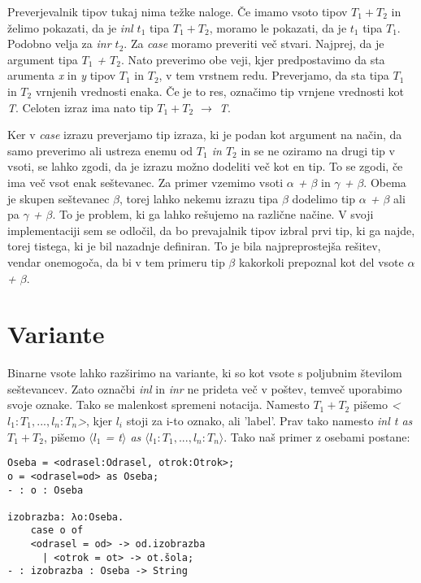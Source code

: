 \documentclass[12pt,a4paper,openany]{book}
\begin{document}
Preverjevalnik tipov tukaj nima težke naloge. Če imamo vsoto tipov \(T_1 + T_2\) in želimo pokazati, da je \emph{inl $t_1$} tipa \emph{$T_1 + T_2$}, moramo le pokazati, da je 
\emph{$t_1$} tipa \emph{$T_1$}. Podobno velja za \emph{inr $t_2$}. Za \emph{case} moramo preveriti več stvari. Najprej, da je argument tipa \emph{$T_1$ + $T_2$}. Nato preverimo 
obe veji, kjer predpostavimo da sta arumenta \emph{x} in \emph{y} tipov \emph{$T_1$} in \emph{$T_2$}, v tem vrstnem redu. Preverjamo, da sta tipa \emph{$T_1$} in \emph{$T_2$} 
vrnjenih vrednosti enaka. Če je to res, označimo tip vrnjene vrednosti kot \emph{T}. Celoten izraz ima nato tip \emph{$T_1 + T_2$ $\rightarrow$ T}.

Ker v \emph{case} izrazu preverjamo tip izraza, ki je podan kot argument na način, da samo preverimo ali ustreza enemu od \emph{\(T_1\) in \(T_2\)} in se ne oziramo na drugi tip v vsoti, 
se lahko zgodi, da je izrazu možno dodeliti več kot en tip. To se zgodi, če ima več vsot enak seštevanec. Za primer vzemimo vsoti \emph{$\alpha$ + $\beta$} in \emph{$\gamma$ + $\beta$}.
Obema je skupen seštevanec \emph{$\beta$}, torej lahko nekemu izrazu tipa \emph{$\beta$} dodelimo tip \emph{$\alpha$ + $\beta$} ali pa \emph{$\gamma$ + $\beta$}. To je problem, ki ga
lahko rešujemo na različne načine. V svoji implementaciji sem se odločil, da bo prevajalnik tipov izbral prvi tip, ki ga najde, torej tistega, ki je bil nazadnje definiran. To je bila 
najpreprostejša rešitev, vendar onemogoča, da bi v tem primeru tip \emph{$\beta$} kakorkoli prepoznal kot del vsote \emph{$\alpha$ + $\beta$}.

\section{Variante}
Binarne vsote lahko razširimo na variante, ki so kot vsote s poljubnim številom seštevancev. Zato označbi \emph{inl} in \emph{inr} ne prideta več v poštev, temveč uporabimo svoje oznake. 
Tako se malenkost spremeni notacija. Namesto \emph{$T_1 + T_2$} pišemo \emph{<$l_1:T_1, ... , l_n:T_n$>}, kjer \(l_i\) stoji za i-to oznako, ali 'label'. Prav tako namesto \emph{inl t as 
$T_1 + T_2$}, pišemo \emph{$\langle l_1$ = t$\rangle$ as $\langle l_1:T_1, ... , l_n:T_n\rangle$}. Tako naš primer z osebami postane:
\begin{lstlisting}
Oseba = <odrasel:Odrasel, otrok:Otrok>;
o = <odrasel=od> as Oseba;
- : o : Oseba

izobrazba: λo:Oseba.
    case o of
    <odrasel = od> -> od.izobrazba
      | <otrok = ot> -> ot.šola;
- : izobrazba : Oseba -> String
\end{lstlisting}
\end{document}
